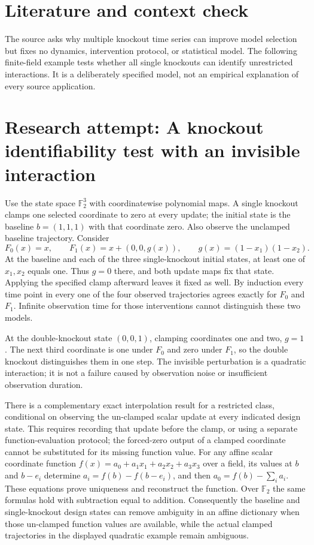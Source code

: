\documentclass[11pt]{article}
\begin{document}
\section{Literature and context check}
The source asks why multiple knockout time series can improve model selection but fixes no dynamics, intervention protocol, or statistical model. The following finite-field example tests whether all single knockouts can identify unrestricted interactions. It is a deliberately specified model, not an empirical explanation of every source application.
\section{Research attempt: A knockout identifiability test with an invisible interaction}
Use the state space $\mathbb F_2^3$ with coordinatewise polynomial maps. A single knockout clamps one selected coordinate to zero at every update; the initial state is the baseline $b=(1,1,1)$ with that coordinate zero. Also observe the unclamped baseline trajectory. Consider
\[
F_0(x)=x,\qquad F_1(x)=x+(0,0,g(x)),\qquad
g(x)=(1-x_1)(1-x_2).
\]
At the baseline and each of the three single-knockout initial states, at least one of $x_1,x_2$ equals one. Thus $g=0$ there, and both update maps fix that state. Applying the specified clamp afterward leaves it fixed as well. By induction every time point in every one of the four observed trajectories agrees exactly for $F_0$ and $F_1$. Infinite observation time for those interventions cannot distinguish these two models.

At the double-knockout state $(0,0,1)$, clamping coordinates one and two, $g=1$. The next third coordinate is one under $F_0$ and zero under $F_1$, so the double knockout distinguishes them in one step. The invisible perturbation is a quadratic interaction; it is not a failure caused by observation noise or insufficient observation duration.

There is a complementary exact interpolation result for a restricted class, conditional on observing the un-clamped scalar update at every indicated design state. This requires recording that update before the clamp, or using a separate function-evaluation protocol; the forced-zero output of a clamped coordinate cannot be substituted for its missing function value. For any affine scalar coordinate function $f(x)=a_0+a_1x_1+a_2x_2+a_3x_3$ over a field, its values at $b$ and $b-e_i$ determine $a_i=f(b)-f(b-e_i)$, and then $a_0=f(b)-\sum_i a_i$. These equations prove uniqueness and reconstruct the function. Over $\mathbb F_2$ the same formulas hold with subtraction equal to addition. Consequently the baseline and single-knockout design states can remove ambiguity in an affine dictionary when those un-clamped function values are available, while the actual clamped trajectories in the displayed quadratic example remain ambiguous.
\end{document}
